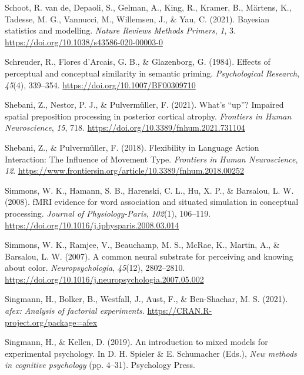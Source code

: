 \documentclass[
  12pt,
  man,floatsintext]{apa7}
\newlength{\cslhangindent}
\newlength{\cslentryspacingunit} %
\newenvironment{CSLReferences}[2] %
 {%
  \setlength{\parindent}{0pt}
  \ifodd #1
  \let\oldpar\par
  \def\par{\hangindent=\cslhangindent\oldpar}
  \fi
  \setlength{\parskip}{#2\cslentryspacingunit}
 }%
 {}
\begin{document}
\begin{CSLReferences}{1}{0}
\leavevmode{}%
Schoot, R. van de, Depaoli, S., Gelman, A., King, R., Kramer, B., Märtens, K., Tadesse, M. G., Vannucci, M., Willemsen, J., \& Yau, C. (2021). Bayesian statistics and modelling. \emph{Nature Reviews Methods Primers}, \emph{1}, 3. \url{https://doi.org/10.1038/s43586-020-00003-0}

\leavevmode{}%
Schreuder, R., Flores d'Arcais, G. B., \& Glazenborg, G. (1984). Effects of perceptual and conceptual similarity in semantic priming. \emph{Psychological Research}, \emph{45}(4), 339--354. \url{https://doi.org/10.1007/BF00309710}

\leavevmode{}%
Shebani, Z., Nestor, P. J., \& Pulvermüller, F. (2021). What's {``up''}? {Impaired} spatial preposition processing in posterior cortical atrophy. \emph{Frontiers in Human Neuroscience}, \emph{15}, 718. \url{https://doi.org/10.3389/fnhum.2021.731104}

\leavevmode{}%
Shebani, Z., \& Pulvermüller, F. (2018). Flexibility in {Language Action Interaction}: {The Influence} of {Movement Type}. \emph{Frontiers in Human Neuroscience}, \emph{12}. \url{https://www.frontiersin.org/article/10.3389/fnhum.2018.00252}

\leavevmode{}%
Simmons, W. K., Hamann, S. B., Harenski, C. L., Hu, X. P., \& Barsalou, L. W. (2008). {fMRI} evidence for word association and situated simulation in conceptual processing. \emph{Journal of Physiology-Paris}, \emph{102}(1), 106--119. \url{https://doi.org/10.1016/j.jphysparis.2008.03.014}

\leavevmode{}%
Simmons, W. K., Ramjee, V., Beauchamp, M. S., McRae, K., Martin, A., \& Barsalou, L. W. (2007). A common neural substrate for perceiving and knowing about color. \emph{Neuropsychologia}, \emph{45}(12), 2802--2810. \url{https://doi.org/10.1016/j.neuropsychologia.2007.05.002}

\leavevmode{}%
Singmann, H., Bolker, B., Westfall, J., Aust, F., \& Ben-Shachar, M. S. (2021). \emph{{afex}: Analysis of factorial experiments}. \url{https://CRAN.R-project.org/package=afex}

\leavevmode{}%
Singmann, H., \& Kellen, D. (2019). An introduction to mixed models for experimental psychology. In D. H. Spieler \& E. Schumacher (Eds.), \emph{New methods in cognitive psychology} (pp. 4--31). {Psychology Press}.


\end{CSLReferences}
\end{document}
